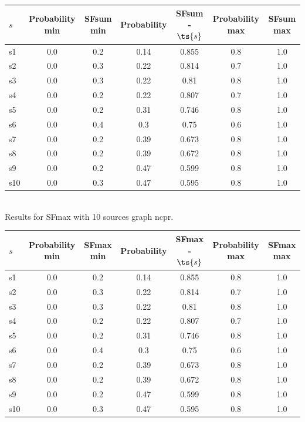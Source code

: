 \documentclass{article}
\begin{document}
\noindent\begin{tabular}{|l|c|c|c|c|c|c|}
\hline
$s$& Probability min & SFsum min & Probability & SFsum - $\ts{s}$ & Probability max & SFsum max\\
\hline
s1 &0.0 & 0.2 & 0.14 & 0.855 & 0.8 & 1.0\\
\hline
s2 &0.0 & 0.3 & 0.22 & 0.814 & 0.7 & 1.0\\
\hline
s3 &0.0 & 0.3 & 0.22 & 0.81 & 0.8 & 1.0\\
\hline
s4 &0.0 & 0.2 & 0.22 & 0.807 & 0.7 & 1.0\\
\hline
s5 &0.0 & 0.2 & 0.31 & 0.746 & 0.8 & 1.0\\
\hline
s6 &0.0 & 0.4 & 0.3 & 0.75 & 0.6 & 1.0\\
\hline
s7 &0.0 & 0.2 & 0.39 & 0.673 & 0.8 & 1.0\\
\hline
s8 &0.0 & 0.2 & 0.39 & 0.672 & 0.8 & 1.0\\
\hline
s9 &0.0 & 0.2 & 0.47 & 0.599 & 0.8 & 1.0\\
\hline
s10 &0.0 & 0.3 & 0.47 & 0.595 & 0.8 & 1.0\\
\hline
\end{tabular}\\

\noindent Results for SFmax with 10 sources graph ncpr.

\noindent\begin{tabular}{|l|c|c|c|c|c|c|}
\hline
$s$& Probability min & SFmax min & Probability & SFmax - $\ts{s}$ & Probability max & SFmax max\\
\hline
s1 &0.0 & 0.2 & 0.14 & 0.855 & 0.8 & 1.0\\
\hline
s2 &0.0 & 0.3 & 0.22 & 0.814 & 0.7 & 1.0\\
\hline
s3 &0.0 & 0.3 & 0.22 & 0.81 & 0.8 & 1.0\\
\hline
s4 &0.0 & 0.2 & 0.22 & 0.807 & 0.7 & 1.0\\
\hline
s5 &0.0 & 0.2 & 0.31 & 0.746 & 0.8 & 1.0\\
\hline
s6 &0.0 & 0.4 & 0.3 & 0.75 & 0.6 & 1.0\\
\hline
s7 &0.0 & 0.2 & 0.39 & 0.673 & 0.8 & 1.0\\
\hline
s8 &0.0 & 0.2 & 0.39 & 0.672 & 0.8 & 1.0\\
\hline
s9 &0.0 & 0.2 & 0.47 & 0.599 & 0.8 & 1.0\\
\hline
s10 &0.0 & 0.3 & 0.47 & 0.595 & 0.8 & 1.0\\
\hline
\end{tabular}\\
\end{document}
